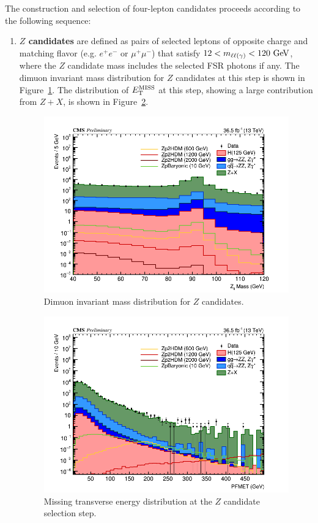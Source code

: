 The construction and selection of four-lepton candidates proceeds 
according to the following sequence:
\begin{enumerate}
\item {\bf $Z$ candidates} are defined as pairs of selected leptons
 of opposite charge and matching flavor (e.g. $e^+ e^-$ or $\mu^+\mu^-$)
 that satisfy $12 < m_{\ell\ell(\gamma)} < 120~\mathrm{Ge\kern -0.1em V}$, where the $Z$ candidate mass
 includes the selected FSR photons if any. The dimuon invariant mass distribution for $Z$ candidates at this step is shown in Figure~\ref{fig:dimuonz}. The distribution of $E_{\rm{T}}^{\rm{MISS}}$ at this step, showing a large contribution from $Z+X$, is shown in Figure~\ref{fig:pfmet3}.

\begin{figure}[tbh]
\centering
\includegraphics[width=5.5in]{figures/hist_hMZ_3.png}
    \caption{Dimuon invariant mass distribution for $Z$ candidates.}
    \label{fig:dimuonz}
\end{figure}

\begin{figure}[tbh]
\centering
\includegraphics[width=5.5in]{figures/hist_hPFMET_3.png}
    \caption{Missing transverse energy distribution at the $Z$ candidate selection step.}
    \label{fig:pfmet3}
\end{figure}


\end{enumerate}
